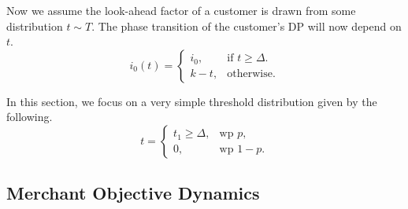 Now we assume the look-ahead factor of a customer is drawn from some distribution $t \sim T$. The phase transition of the customer's DP will now depend on $t$.
\begin{equation*}
  i_0(t)=\begin{cases}
    i_0, & \text{if $t \geq \Delta$}.\\
    k-t, & \text{otherwise}.
  \end{cases}
\end{equation*}

In this section, we focus on a very simple threshold distribution given by the following.
\begin{equation*}
  t=\begin{cases}
    t_1\geq \Delta, & \text{wp } p,\\
    0, & \text{wp } 1-p.
  \end{cases}
\end{equation*}

\subsection{Merchant Objective Dynamics}
